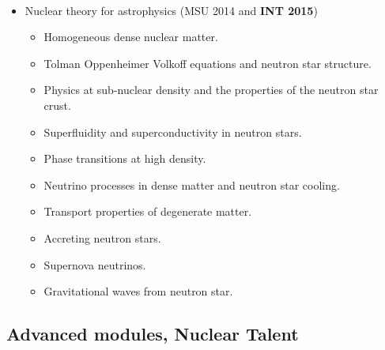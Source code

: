 \documentclass[%
twoside,                 %
final,                   %
10pt]{article}
\begin{document}
\paragraph{}
\begin{itemize}
\item Nuclear theory for astrophysics (MSU 2014 and \textbf{INT 2015})
\begin{itemize}

  \item Homogeneous dense nuclear matter.

  \item Tolman Oppenheimer Volkoff equations and neutron star structure.

  \item Physics at sub-nuclear density and the properties of the neutron star crust.

  \item Superfluidity and superconductivity in neutron stars.

  \item Phase transitions at high density.

  \item Neutrino processes in dense matter and neutron star cooling.

  \item Transport properties of degenerate matter.

  \item Accreting neutron stars.

  \item Supernova neutrinos.

  \item Gravitational waves from neutron star.
\end{itemize}

\noindent
\end{itemize}

\noindent





\subsection*{Advanced  modules, Nuclear Talent}

\end{document}
